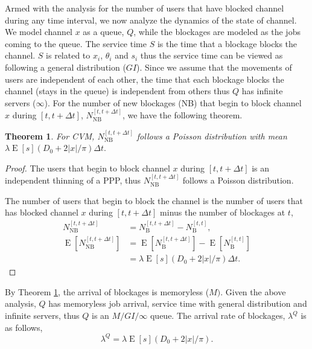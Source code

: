 \documentclass[10pt, conference, letterpaper]{IEEEtran}
\newtheorem{theorem}{Theorem}
\DeclareMathOperator*{\E}{\mathrm{E}}
\begin{document}
Armed with the analysis for the number of users that have blocked channel during any time interval, we now analyze the dynamics of the state of channel. 
We model channel $x$ as a queue, $Q$, while the blockages are modeled as the jobs coming to the queue. 
The service time $S$ is the time that a blockage blocks the channel. $S$ is related to $x_i$, $\theta_i$ and $s_i$ thus the service time can be viewed as following a general distribution ($GI$). 
Since we assume that the movements of users are independent of each other, the time that each blockage blocks the channel (stays in the queue) is independent from others thus $Q$ has infinite servers ($\infty$). 
For the number of new blockages (NB) that begin to block channel $x$ during $[t, t+\Delta t]$, $N_{\mathrm{NB}}^{[t, t+\Delta t]}$, we have the following theorem.

\begin{theorem}\label{theorem:poisson_arrival}
For CVM, $N_{\mathrm{NB}}^{[t, t+\Delta t]}$ follows a Poisson distribution with mean $\lambda\E[s](D_0 + 2|x|/\pi)\Delta t.$
\end{theorem}
\begin{proof}
The users that begin to block channel $x$ during $[t, t+\Delta t]$ is an independent thinning of a PPP, thus $N_{\mathrm{NB}}^{[t, t+\Delta t]}$ follows a Poisson distribution. 

The number of users that begin to block the channel is the number of users that has blocked channel $x$ during $[t, t+\Delta t]$ minus the number of blockages at $t$,  
\begin{equation*}
\begin{aligned}
N_{\mathrm{NB}}^{[t, t+\Delta t]} & = N_\mathrm{B}^{[t, t+\Delta t]} - N_\mathrm{B}^{[t, t]}, \\
\E[N_{\mathrm{NB}}^{[t, t+\Delta t]}] & = \E[N_\mathrm{B}^{[t, t+\Delta t]}] - \E[N_\mathrm{B}^{[t, t]}] \\
									  & = \lambda\E[s](D_0 + 2|x|/\pi)\Delta t.
\end{aligned}
\end{equation*}
\end{proof}

By Theorem \ref{theorem:poisson_arrival}, the arrival of blockages is memoryless ($M)$.  Given the above analysis, $Q$ has memoryless job arrival, service time with general distribution and infinite servers, thus $Q$ is an $M/GI/\infty$ queue. The arrival rate of blockages, $\lambda^Q$ is as follows,
\begin{equation}\label{eq:lambda_queue}
\lambda^Q = \lambda\E[s](D_0 + 2|x|/\pi).
\end{equation} 
\end{document}
